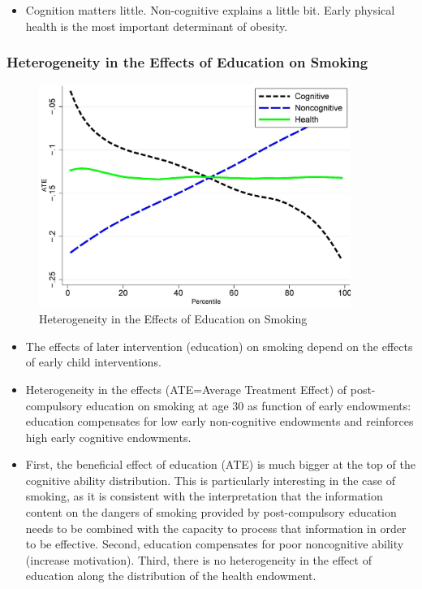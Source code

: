 \begin{itemize}
    \item Cognition matters little. Non-cognitive explains a little bit. Early physical health is the most important determinant of obesity.
\end{itemize}

\subsubsection{Heterogeneity in the Effects of Education on Smoking}    
\begin{figure}[H]%
                \centering
                \includegraphics[width=4in]{images/ch3/47.png}
                \caption {Heterogeneity in the Effects of Education on Smoking}
                \label{fig:label}
            \end{figure} 
            
\begin{itemize}
    \item The effects of later intervention (education) on smoking depend on the effects of early child interventions.
    \item Heterogeneity in the effects (ATE=Average Treatment Effect) of post-compulsory education on smoking at age 30 as function of early endowments: education compensates for low early non-cognitive endowments and reinforces high early cognitive endowments.
    \item First, the beneficial effect of education (ATE) is much bigger at the top of the cognitive ability distribution. This is particularly interesting in the case of smoking, as it is consistent with the interpretation that the information content on the dangers of smoking provided by post-compulsory education needs to be combined with the capacity to process that information in order to be effective. Second,  education compensates for poor noncognitive ability (increase motivation). Third, there is no heterogeneity in the effect of education along the distribution of the health endowment. 
 
\end{itemize}


